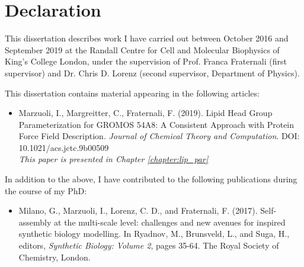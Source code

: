 \chapter*{Declaration}
\begin{onehalfspacing}

\noindent This dissertation describes work I have carried out between October 2016 and September 2019 at the Randall Centre for Cell and Molecular Biophysics of King's College London, under the supervision of Prof. Franca Fraternali (first supervisor) and Dr. Chris D. Lorenz (second supervisor, Department of Physics).

\vspace{.2cm}

\noindent This dissertation contains material appearing in the following articles:

\begin{itemize}
\item Marzuoli, I., Margreitter, C., Fraternali, F. (2019). Lipid Head Group Parameterization for GROMOS 54A8: A Consistent Approach with Protein Force Field Description. \emph{Journal of Chemical Theory and Computation}. DOI: 10.1021/acs.jctc.9b00509  \\
\emph{This paper is presented in Chapter \ref{chapter:lip_par}}
\end{itemize}

\noindent In addition to the above, I have contributed to the following publications during the course of my PhD:

\begin{itemize}
%
\item Milano, G., Marzuoli, I., Lorenz, C. D., and Fraternali, F. (2017). Self-assembly at the multi-scale level: challenges and new avenues for inspired synthetic biology modelling. In Ryadnov, M., Brunsveld, L., and Suga, H., editors, \emph{Synthetic Biology: Volume 2}, pages 35-64. The Royal Society of Chemistry, London.
%
\end{itemize}



\end{onehalfspacing}
